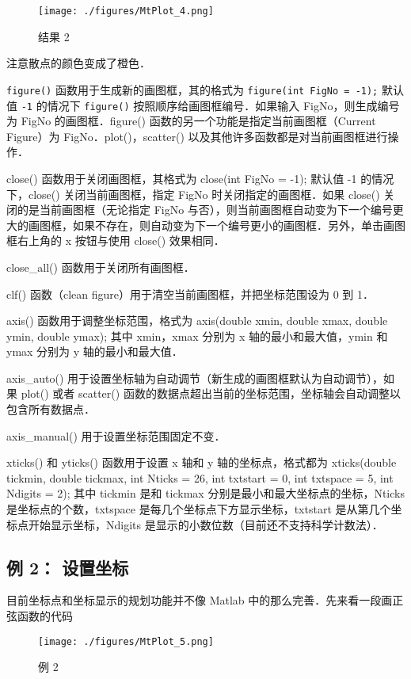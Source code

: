 \begin{figure}[ht]
\centering
\texttt{[image: ./figures/MtPlot\_4.png]}
\caption{结果 2} \label{MtPlot_fig4}
\end{figure}

注意散点的颜色变成了橙色．

\verb|figure()| 函数用于生成新的画图框，其的格式为
\verb|figure(int FigNo = -1);|
默认值 \verb|-1| 的情况下 \verb|figure()| 按照顺序给画图框编号．如果输入 FigNo，则生成编号为 FigNo 的画图框．figure() 函数的另一个功能是指定当前画图框（Current Figure）为 FigNo．plot()，scatter() 以及其他许多函数都是对当前画图框进行操作．

close() 函数用于关闭画图框，其格式为
close(int FigNo = -1);
默认值 -1 的情况下，close() 关闭当前画图框，指定 FigNo 时关闭指定的画图框．如果 close() 关闭的是当前画图框（无论指定 FigNo 与否），则当前画图框自动变为下一个编号更大的画图框，如果不存在，则自动变为下一个编号更小的画图框．另外，单击画图框右上角的 x 按钮与使用 close() 效果相同．

close_all() 函数用于关闭所有画图框．

clf() 函数（clean figure）用于清空当前画图框，并把坐标范围设为 0 到 1．

axis() 函数用于调整坐标范围，格式为
axis(double xmin, double xmax, double ymin, double ymax);
其中 xmin，xmax 分别为 x 轴的最小和最大值，ymin 和 ymax 分别为 y 轴的最小和最大值．

axis_auto() 用于设置坐标轴为自动调节（新生成的画图框默认为自动调节），如果 plot() 或者 scatter() 函数的数据点超出当前的坐标范围，坐标轴会自动调整以包含所有数据点．

axis_manual() 用于设置坐标范围固定不变．

xticks() 和 yticks() 函数用于设置 x 轴和 y 轴的坐标点，格式都为
xticks(double tickmin, double tickmax, int Nticks = 26, int txtstart = 0, int txtspace = 5, int Ndigits = 2);
其中 tickmin 是和 tickmax 分别是最小和最大坐标点的坐标，Nticks 是坐标点的个数，txtspace 是每几个坐标点下方显示坐标，txtstart 是从第几个坐标点开始显示坐标，Ndigits 是显示的小数位数（目前还不支持科学计数法）．

\subsection{例 2： 设置坐标}

目前坐标点和坐标显示的规划功能并不像 Matlab 中的那么完善．先来看一段画正弦函数的代码

\begin{figure}[ht]
\centering
\texttt{[image: ./figures/MtPlot\_5.png]}
\caption{例 2} \label{MtPlot_fig5}
\end{figure}

